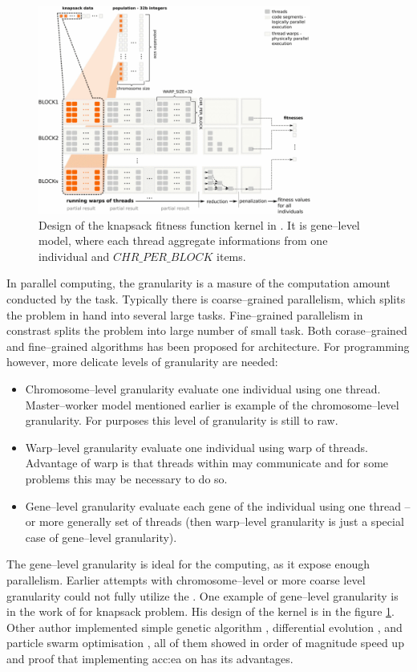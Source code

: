 \begin{figure}[hb!]
    \centering
    \includegraphics[width=0.8\textwidth]{img/KnapsackKernelDesign.png}
    \caption{Design of the knapsack fitness function kernel in \citet{GpuIsland}. It is gene--level model, where each thread aggregate informations from one individual and $CHR\_PER\_BLOCK$ items.}
    \label{fig:knapsackkernel}
\end{figure}

In parallel computing, the granularity is a masure of the computation amount conducted by the task. Typically there is coarse--grained parallelism, which splits the problem in hand into several large tasks. Fine--grained parallelism in constrast splits the problem into large number of small task. Both corase--grained and fine--grained algorithms has been proposed for \cpu architecture. For \gpu programming however, more delicate levels of granularity are needed:
\begin{itemize}
    \item Chromosome--level granularity evaluate one individual using one thread. Master--worker model mentioned earlier is example of the chromosome--level granularity. For \cuda purposes this level of granularity is still to raw.
    \item Warp--level granularity evaluate one individual using warp of threads. Advantage of warp is that threads within may communicate and for some problems this may be necessary to do so.
    \item Gene--level granularity evaluate each gene of the individual using one thread -- or more generally set of threads (then warp--level granularity is just a special case of gene--level granularity).     
\end{itemize}
The gene--level granularity is ideal for the \gpu computing, as it expose enough parallelism. Earlier attempts with chromosome--level or more coarse level granularity could not fully utilize the \gpuns. One example of gene--level granularity is in the work of \citet*{GpuIsland} for knapsack problem. His design of the \cuda kernel is in the figure \ref{fig:knapsackkernel}. Other author implemented simple genetic algorithm \citep{SimpleGACUDA}, differential evolution \citep{DifferentialEvaCUDA}, and particle swarm optimisation \citep{PSOCUDA}, all of them showed in order of magnitude speed up and proof that implementing \acrlong{acc:ea} on \gpu has its advantages.
